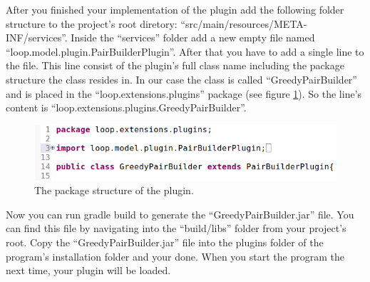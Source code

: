 \documentclass[parskip=full,11pt]{scrartcl}
\begin{document}
After you finished your implementation of the plugin add the following folder structure to the project's root diretory: \enquote{src/main/resources/META-INF/services}. Inside the \enquote{services} folder add a new empty file named \enquote{loop.model.plugin.PairBuilderPlugin}. After that you have to add a single line to the file. This line consist of the plugin's full class name including the package structure the class resides in. In our case the class is called \enquote{GreedyPairBuilder} and is placed in the \enquote{loop.extensions.plugins} package (see figure \ref{fig:package}). So the line's content is \enquote{loop.extensions.plugins.GreedyPairBuilder}.

\begin{figure} [hbt]
	\centering
	\includegraphics[width=0.9\linewidth]{img_manual/package-structure.png}
	\caption{The package structure of the plugin.}
	\label{fig:package}
\end{figure}

Now you can run gradle build to generate the \enquote{GreedyPairBuilder.jar} file. You can find this file by navigating into the \enquote{build/libs} folder from your project's root. Copy the \enquote{GreedyPairBuilder.jar} file into the plugins folder of the program's installation folder and your done. When you start the program the next time, your plugin will be loaded.
\end{document}
